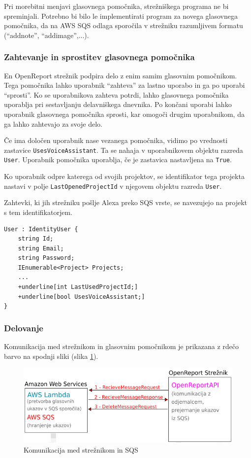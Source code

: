\documentclass[a4paper, 12pt]{book}
\begin{document}
Pri morebitni menjavi glasovnega pomočnika, strežniškega programa ne bi spreminjali.
Potrebno bi bilo le implementirati program za novega glasovnega pomočnika, da na AWS SQS odlaga sporočila v strežniku razumljivem formatu (\enquote{addnote}, \enquote{addimage},...).

\subsubsection{Zahtevanje in sprostitev glasovnega pomočnika}

En OpenReport strežnik podpira delo z enim samim glasovnim pomočnikom.
Tega pomočnika lahko uporabnik \enquote{zahteva} za lastno uporabo in ga po uporabi \enquote{sprosti}.
Ko se uporabnikova zahteva potrdi, lahko glasovnega pomočnika uporablja pri sestavljanju delavniškega dnevnika.
Po končani uporabi lahko uporabnik glasovnega pomočnika sprosti, kar omogoči drugim uporabnikom, da ga lahko zahtevajo za svoje delo.

Če ima določen uporabnik nase vezanega pomočnika, vidimo po vrednosti zastavice \texttt{UsesVoiceAssistant}.
Ta se nahaja v uporabnikovem objektu razreda \texttt{User}.
Uporabnik pomočnika uporablja, če je zastavica nastavljena na \texttt{True}.

Ko uporabnik odpre katerega od svojih projektov, se identifikator tega projekta nastavi v polje \texttt{LastOpenedProjectId} v njegovem objektu razreda \texttt{User}.

Zahtevki, ki jih strežniku pošlje Alexa preko SQS vrste, se navezujejo na projekt s tem identifikatorjem.

\begin{Verbatim}[commandchars=+\[\]]
User : IdentityUser {
    string Id; 
    string Email;
    string Password; 
    IEnumerable<Project> Projects;
    ... 
    +underline[int LastUsedProjectId;]
    +underline[bool UsesVoiceAssistant;]
}
\end{Verbatim}

\subsubsection{Delovanje}

Komunikacija med strežnikom in glasovnim pomočnikom je prikazana z rdečo barvo na spodnji sliki (slika \ref{plan_sqs_server}).

\begin{figure}[H]
\begin{center}
\includegraphics[width=13cm]{plan_sqs_server}
\end{center}
\caption{Komunikacija med strežnikom in SQS}
\label{plan_sqs_server}
\end{figure}
\end{document}

